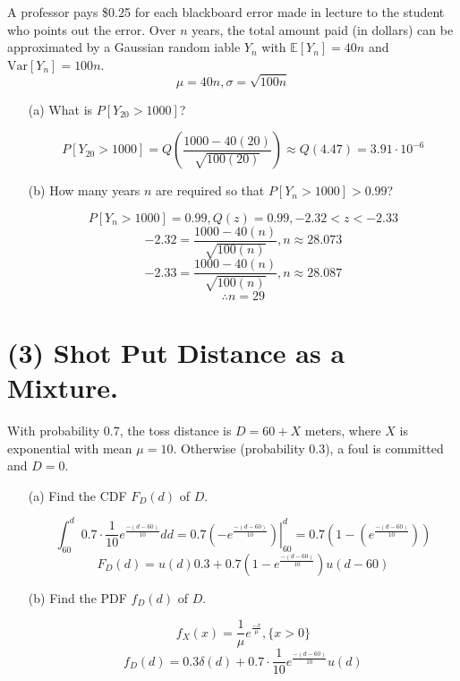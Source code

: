 \documentclass[12pt]{article}
\newenvironment{bluetext}{\color{blue}}{}
\begin{document}
A professor pays \$0.25 for each blackboard error made in lecture to the student who
points out the error. Over $n$ years, the total amount paid (in dollars) can be approximated by a Gaussian random iable $Y_n$ with $\mathbb{E}[Y_n] = 40n$ and $\text{Var}[Y_n] = 100n$.
\begin{bluetext}
    \[\mu = 40n, \sigma = \sqrt{100n}\]
\end{bluetext}
\begin{enumerate}
    \item[(a)] What is $P[Y_{20} > 1000]$?
    \item[] \begin{bluetext} 
        \[P[Y_{20} > 1000]=Q\left(\frac{1000-40(20)}{\sqrt{100(20)}}\right)\approx Q\left(4.47\right)=3.91\cdot10^{-6}\]
    \end{bluetext}
    \item[(b)] How many years $n$ are required so that $P[Y_n > 1000] > 0.99$?
    \item[] \begin{bluetext}
     \[P[Y_n > 1000] = 0.99, Q\left(z\right)=0.99, -2.32<z<-2.33\]
     \[-2.32 = \frac{1000-40(n)}{\sqrt{100(n)}}, n\approx 28.073\]
     \[-2.33 = \frac{1000-40(n)}{\sqrt{100(n)}}, n\approx 28.087\]
     \[\therefore n = 29\]
    \end{bluetext}
\end{enumerate}

\vspace{1cm}
\newpage

\section*{(3) Shot Put Distance as a Mixture.}

With probability 0.7, the toss distance is $D = 60 + X$ meters, where $X$ is exponential
with mean $\mu = 10$. Otherwise (probability 0.3), a foul is committed and $D = 0$.
\begin{enumerate}
    \item[(a)] Find the CDF $F_D(d)$ of $D$.
    \item[] \begin{bluetext}
    \[\int_{60}^{d} 0.7\cdot \frac{1}{10}e^{\frac{-(d-60)}{10}}dd=0.7\left.\left(-e^{\frac{-(d-60)}{10}}\right)\right\rvert_{60}^d=0.7\left(1-\left(e^{\frac{-(d-60)}{10}}\right)\right)\]
                \[F_D(d)=u(d)0.3+0.7\left( 1 - e^{\frac{-(d-60)}{10}} \right)u(d-60)\]
    \end{bluetext}
    \item[(b)] Find the PDF $f_D(d)$ of $D$.
    \item[] \begin{bluetext}
        \[f_X(x)= \frac{1}{\mu}e^{\frac{-x}{\mu}}, \{x>0\} \]
        \[f_D(d)=0.3\delta(d)+
        0.7\cdot \frac{1}{10}e^{\frac{-(d-60)}{10}}u(d)
        \]
    \end{bluetext}
\end{enumerate}
\end{document}
